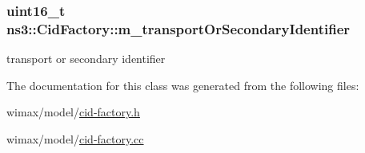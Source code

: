 \subsubsection[{\texorpdfstring{m\+\_\+transport\+Or\+Secondary\+Identifier}{m_transportOrSecondaryIdentifier}}]{\setlength{\rightskip}{0pt plus 5cm}uint16\+\_\+t ns3\+::\+Cid\+Factory\+::m\+\_\+transport\+Or\+Secondary\+Identifier\hspace{0.3cm}{\ttfamily [private]}}\hypertarget{classns3_1_1CidFactory_a77d828478ef29d8c0eeede6e9406401b}{}\label{classns3_1_1CidFactory_a77d828478ef29d8c0eeede6e9406401b}


transport or secondary identifier 



The documentation for this class was generated from the following files\+:\begin{DoxyCompactItemize}
\item 
wimax/model/\hyperlink{cid-factory_8h}{cid-\/factory.\+h}\item 
wimax/model/\hyperlink{cid-factory_8cc}{cid-\/factory.\+cc}\end{DoxyCompactItemize}
